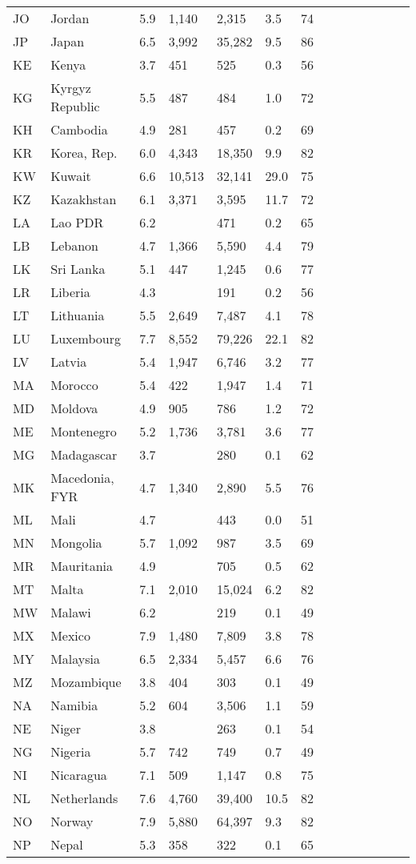 \begin{scriptsize}
\begin{center}
\begin{longtable}{llllllllllllll}
JO&Jordan&5.9&1,140&2,315&3.5&74\\
JP&Japan&6.5&3,992&35,282&9.5&86\\
KE&Kenya&3.7&451&525&0.3&56\\
KG&Kyrgyz Republic&5.5&487&484&1.0&72\\
KH&Cambodia&4.9&281&457&0.2&69\\
KR&Korea, Rep.&6.0&4,343&18,350&9.9&82\\
KW&Kuwait&6.6&10,513&32,141&29.0&75\\
KZ&Kazakhstan&6.1&3,371&3,595&11.7&72\\
LA&Lao PDR&6.2&&471&0.2&65\\
LB&Lebanon&4.7&1,366&5,590&4.4&79\\
LK&Sri Lanka&5.1&447&1,245&0.6&77\\
LR&Liberia&4.3&&191&0.2&56\\
LT&Lithuania&5.5&2,649&7,487&4.1&78\\
LU&Luxembourg&7.7&8,552&79,226&22.1&82\\
LV&Latvia&5.4&1,947&6,746&3.2&77\\
MA&Morocco&5.4&422&1,947&1.4&71\\
MD&Moldova&4.9&905&786&1.2&72\\
ME&Montenegro&5.2&1,736&3,781&3.6&77\\
MG&Madagascar&3.7&&280&0.1&62\\
MK&Macedonia, FYR&4.7&1,340&2,890&5.5&76\\
ML&Mali&4.7&&443&0.0&51\\
MN&Mongolia&5.7&1,092&987&3.5&69\\
MR&Mauritania&4.9&&705&0.5&62\\
MT&Malta&7.1&2,010&15,024&6.2&82\\
MW&Malawi&6.2&&219&0.1&49\\
MX&Mexico&7.9&1,480&7,809&3.8&78\\
MY&Malaysia&6.5&2,334&5,457&6.6&76\\
MZ&Mozambique&3.8&404&303&0.1&49\\
NA&Namibia&5.2&604&3,506&1.1&59\\
NE&Niger&3.8&&263&0.1&54\\
NG&Nigeria&5.7&742&749&0.7&49\\
NI&Nicaragua&7.1&509&1,147&0.8&75\\
NL&Netherlands&7.6&4,760&39,400&10.5&82\\
NO&Norway&7.9&5,880&64,397&9.3&82\\
NP&Nepal&5.3&358&322&0.1&65\\

\end{longtable}
\end{center}
\end{scriptsize}
